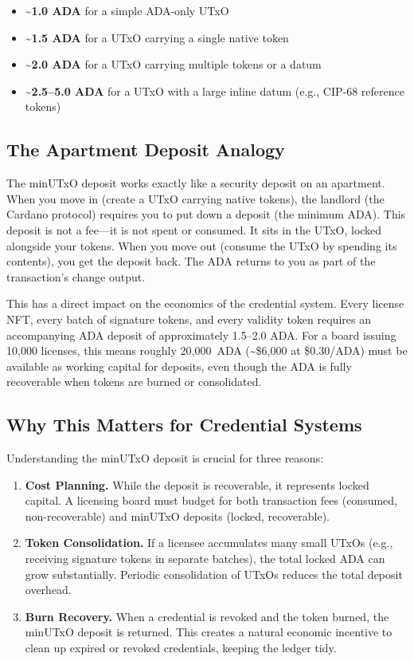 \begin{itemize}[nosep]
  \item \textbf{\textasciitilde1.0 ADA} for a simple ADA-only UTxO
  \item \textbf{\textasciitilde1.5 ADA} for a UTxO carrying a single
    native token
  \item \textbf{\textasciitilde2.0 ADA} for a UTxO carrying multiple
    tokens or a datum
  \item \textbf{\textasciitilde2.5--5.0 ADA} for a UTxO with a large
    inline datum (e.g., CIP-68 reference tokens)
\end{itemize}

\subsection{The Apartment Deposit Analogy}

The minUTxO deposit works exactly like a security deposit on an
apartment. When you move in (create a UTxO carrying native tokens), the
landlord (the Cardano protocol) requires you to put down a deposit (the
minimum ADA). This deposit is not a fee---it is not spent or consumed.
It sits in the UTxO, locked alongside your tokens. When you move out
(consume the UTxO by spending its contents), you get the deposit back.
The ADA returns to you as part of the transaction's change output.

This has a direct impact on the economics of the credential system.
Every license NFT, every batch of signature tokens, and every validity
token requires an accompanying ADA deposit of approximately 1.5--2.0
ADA. For a board issuing 10,000 licenses, this means roughly 20,000~ADA
(\textasciitilde\$6,000 at \$0.30/ADA) must be available as working
capital for deposits, even though the ADA is fully recoverable when
tokens are burned or consolidated.

\subsection{Why This Matters for Credential Systems}

Understanding the minUTxO deposit is crucial for three reasons:

\begin{enumerate}[nosep]
  \item \textbf{Cost Planning.} While the deposit is recoverable, it
    represents locked capital. A licensing board must budget for both
    transaction fees (consumed, non-recoverable) and minUTxO deposits
    (locked, recoverable).
  \item \textbf{Token Consolidation.} If a licensee accumulates many
    small UTxOs (e.g., receiving signature tokens in separate batches),
    the total locked ADA can grow substantially. Periodic consolidation
    of UTxOs reduces the total deposit overhead.
  \item \textbf{Burn Recovery.} When a credential is revoked and the
    token burned, the minUTxO deposit is returned. This creates a
    natural economic incentive to clean up expired or revoked
    credentials, keeping the ledger tidy.
\end{enumerate}


